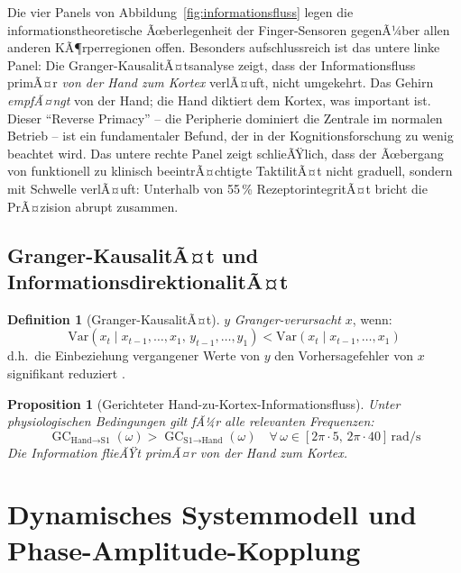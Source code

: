 ﻿\documentclass[12pt,a4paper]{report}
\theoremstyle{plain}
\newtheorem{proposition}[theorem]{Proposition}
\theoremstyle{definition}
\newtheorem{definition}[theorem]{Definition}
\theoremstyle{remark}
\DeclareMathOperator{\GC}{GC}
\begin{document}
Die vier Panels von Abbildung~\ref{fig:informationsfluss} legen die
informationstheoretische Ãœberlegenheit der Finger-Sensoren gegenÃ¼ber allen
anderen KÃ¶rperregionen offen. Besonders aufschlussreich ist das untere linke
Panel: Die Granger-KausalitÃ¤tsanalyse zeigt, dass der Informationsfluss
primÃ¤r \emph{von der Hand zum Kortex} verlÃ¤uft, nicht umgekehrt. Das Gehirn
\emph{empfÃ¤ngt} von der Hand; die Hand diktiert dem Kortex, was important ist.
Dieser ``Reverse Primacy'' -- die Peripherie dominiert die Zentrale im
normalen Betrieb -- ist ein fundamentaler Befund, der in der Kognitionsforschung
zu wenig beachtet wird. Das untere rechte Panel zeigt schlieÃŸlich, dass der
Ãœbergang von funktionell zu klinisch beeintrÃ¤chtigte TaktilitÃ¤t nicht
graduell, sondern mit Schwelle verlÃ¤uft: Unterhalb von 55\,\% RezeptorintegritÃ¤t
bricht die PrÃ¤zision abrupt zusammen.

\section{Granger-KausalitÃ¤t und InformationsdirektionalitÃ¤t}

\begin{definition}[Granger-KausalitÃ¤t]
$y$ \emph{Granger-verursacht} $x$, wenn:
\[
  \mathrm{Var}(x_t \mid x_{t-1},\ldots, x_1,\, y_{t-1},\ldots, y_1)
  < \mathrm{Var}(x_t \mid x_{t-1},\ldots, x_1)
\]
d.h.\ die Einbeziehung vergangener Werte von $y$ den Vorhersagefehler
von $x$ signifikant reduziert \cite{granger1969}.
\end{definition}

\begin{proposition}[Gerichteter Hand-zu-Kortex-Informationsfluss]
\label{prop:granger}
Unter physiologischen Bedingungen gilt fÃ¼r alle relevanten Frequenzen:
\[
  \GC_{\text{Hand} \to \text{S1}}(\omega)
  > \GC_{\text{S1} \to \text{Hand}}(\omega)
  \quad \forall\,\omega \in [2\pi \cdot 5,\, 2\pi \cdot 40]\,\mathrm{rad/s}
\]
Die Information flieÃŸt primÃ¤r von der Hand zum Kortex.
\end{proposition}

\chapter{Dynamisches Systemmodell und Phase-Amplitude-Kopplung}
\label{chap:systemmodell}
\end{document}
